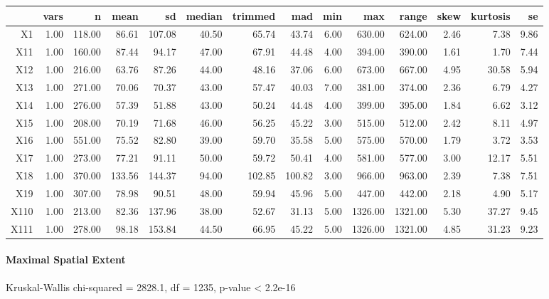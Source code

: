\begin{tabular}{rrrrrrrrrrrrrr}
  \hline
 & vars & n & mean & sd & median & trimmed & mad & min & max & range & skew & kurtosis & se \\ 
  \hline
X1 & 1.00 & 118.00 & 86.61 & 107.08 & 40.50 & 65.74 & 43.74 & 6.00 & 630.00 & 624.00 & 2.46 & 7.38 & 9.86 \\ 
  X11 & 1.00 & 160.00 & 87.44 & 94.17 & 47.00 & 67.91 & 44.48 & 4.00 & 394.00 & 390.00 & 1.61 & 1.70 & 7.44 \\ 
  X12 & 1.00 & 216.00 & 63.76 & 87.26 & 44.00 & 48.16 & 37.06 & 6.00 & 673.00 & 667.00 & 4.95 & 30.58 & 5.94 \\ 
  X13 & 1.00 & 271.00 & 70.06 & 70.37 & 43.00 & 57.47 & 40.03 & 7.00 & 381.00 & 374.00 & 2.36 & 6.79 & 4.27 \\ 
  X14 & 1.00 & 276.00 & 57.39 & 51.88 & 43.00 & 50.24 & 44.48 & 4.00 & 399.00 & 395.00 & 1.84 & 6.62 & 3.12 \\ 
  X15 & 1.00 & 208.00 & 70.19 & 71.68 & 46.00 & 56.25 & 45.22 & 3.00 & 515.00 & 512.00 & 2.42 & 8.11 & 4.97 \\ 
  X16 & 1.00 & 551.00 & 75.52 & 82.80 & 39.00 & 59.70 & 35.58 & 5.00 & 575.00 & 570.00 & 1.79 & 3.72 & 3.53 \\ 
  X17 & 1.00 & 273.00 & 77.21 & 91.11 & 50.00 & 59.72 & 50.41 & 4.00 & 581.00 & 577.00 & 3.00 & 12.17 & 5.51 \\ 
  X18 & 1.00 & 370.00 & 133.56 & 144.37 & 94.00 & 102.85 & 100.82 & 3.00 & 966.00 & 963.00 & 2.39 & 7.38 & 7.51 \\ 
  X19 & 1.00 & 307.00 & 78.98 & 90.51 & 48.00 & 59.94 & 45.96 & 5.00 & 447.00 & 442.00 & 2.18 & 4.90 & 5.17 \\ 
  X110 & 1.00 & 213.00 & 82.36 & 137.96 & 38.00 & 52.67 & 31.13 & 5.00 & 1326.00 & 1321.00 & 5.30 & 37.27 & 9.45 \\ 
  X111 & 1.00 & 278.00 & 98.18 & 153.84 & 44.50 & 66.95 & 45.22 & 5.00 & 1326.00 & 1321.00 & 4.85 & 31.23 & 9.23 \\ 
   \hline
\end{tabular}

\paragraph{Maximal Spatial Extent}
Kruskal-Wallis chi-squared = 2828.1, df = 1235, p-value < 2.2e-16

